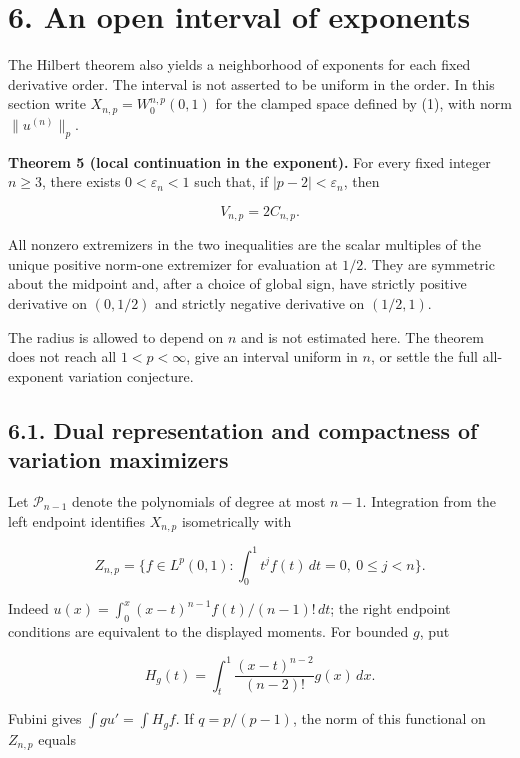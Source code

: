 \documentclass[11pt]{article}
\begin{document}
\section{6. An open interval of
exponents}\label{an-open-interval-of-exponents}

The Hilbert theorem also yields a neighborhood of exponents for each
fixed derivative order. The interval is not asserted to be uniform in
the order. In this section write \(X_{n,p}=W_0^{n,p}(0,1)\) for the
clamped space defined by (1), with norm \(\|u^{(n)}\|_p\).

\textbf{Theorem 5 (local continuation in the exponent).} For every fixed
integer \(n\ge3\), there exists \(0<\varepsilon_n<1\) such that, if
\(|p-2|<\varepsilon_n\), then

\[
V_{n,p}=2C_{n,p}.
\tag{6.1}
\]

All nonzero extremizers in the two inequalities are the scalar multiples
of the unique positive norm-one extremizer for evaluation at \(1/2\).
They are symmetric about the midpoint and, after a choice of global
sign, have strictly positive derivative on \((0,1/2)\) and strictly
negative derivative on \((1/2,1)\).

The radius is allowed to depend on \(n\) and is not estimated here. The
theorem does not reach all \(1<p<\infty\), give an interval uniform in
\(n\), or settle the full all-exponent variation conjecture.

\subsection{6.1. Dual representation and compactness of variation
maximizers}\label{dual-representation-and-compactness-of-variation-maximizers}

Let \(\mathcal P_{n-1}\) denote the polynomials of degree at most
\(n-1\). Integration from the left endpoint identifies \(X_{n,p}\)
isometrically with

\[
Z_{n,p}=\{f\in L^p(0,1):\int_0^1t^jf(t)\,dt=0,\ 0\le j<n\}.
\tag{6.2}
\]

Indeed \(u(x)=\int_0^x(x-t)^{n-1}f(t)/(n-1)!\,dt\); the right endpoint
conditions are equivalent to the displayed moments. For bounded \(g\),
put

\[
H_g(t)=\int_t^1\frac{(x-t)^{n-2}}{(n-2)!}g(x)\,dx.
\tag{6.3}
\]

Fubini gives \(\int gu'=\int H_gf\). If \(q=p/(p-1)\), the norm of this
functional on \(Z_{n,p}\) equals
\end{document}
